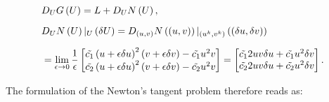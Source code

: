 \begin{equation} \label{eq:jac}
\begin{aligned}
& D_{U} G\left(U\right) = L + D_U N\left(U\right),
\\[6pt]
& D_U N\left(U\right)|_{U} \left(\delta U\right) = D_{\left(u, v\right)} N\left(\left(u, v\right)\right)|_{\left(u^k, v^k\right)} \left(\left(\delta u, \delta v\right)\right) \\[6pt]
 & =  \lim_{\epsilon \to 0} \frac{1}{\epsilon} \begin{bmatrix}
 \Tilde{c_1} \left(u + \epsilon \delta u \right)^2 \left(v + \epsilon \delta v\right) - \Tilde{c_1} u^2 v \\  \Tilde{c_2} \left(u + \epsilon \delta u \right)^2 \left(v + \epsilon \delta v\right) - \Tilde{c_2} u^2 v \end{bmatrix} = \begin{bmatrix} \Tilde{c_1} 2 u v \delta u + \Tilde{c_1} u^2 \delta v \\ \Tilde{c_2} 2 u v \delta u + \Tilde{c_2} u^2 \delta v \end{bmatrix}.
\end{aligned}
\end{equation}

The formulation of the Newton's tangent problem therefore reads as:

